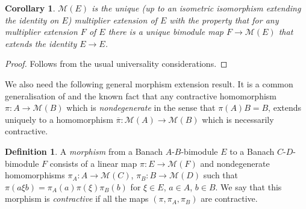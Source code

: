 \documentclass[11 pt, leqno]{amsart}
\numberwithin{equation}{section}
\theoremstyle{plain}
\newtheorem{cor}[thm]{Corollary}
\theoremstyle{definition}
\newtheorem {defn}[thm] {Definition}
\newcommand{\M}{\mathcal M}
\begin{document}
\begin{cor}\label{cor:universal_multipliers}
$\M(E)$ is the unique (up to an isometric isomorphism extending the identity on $E$) multiplier extension of $E$ with the property that for any multiplier extension $F$ of $E$ there is a unique bimodule map $F\to \M(E)$ that extends the identity $E\to E$. 
\end{cor}
\begin{proof} 
Follows from the usual universality considerations.
\end{proof}

We also need the following general morphism extension result. 
It is a common generalisation of \cite[Theorem 2.8]{Daws} and the known fact that any contractive homomorphism $\pi:A\to \M(B)$ which is \emph{nondegenerate} in the sense that $\pi(A)B=B$, extends uniquely to a homomorphism $\overline{\pi}:\M(A)\to \M(B)$ which is  necessarily contractive.

\begin{defn}\label{def:bimodule_morphism}
A \emph{morphism} from  a Banach $A$-$B$-bimodule $E$ to a Banach $C$-$D$-bimodule $F$ consists of a linear map $\pi:E\to \M(F)$ and nondegenerate homomorphisms $\pi_A:A\to \M(C)$, $\pi_B:B\to \M(D)$ such that $\pi(a\xi b)=\pi_A(a)\pi(\xi)\pi_B(b)$ for $\xi \in E$, $a\in A$, $b\in B$.
We say that this morphism is \emph{contractive} if all the maps $(\pi,\pi_A,\pi_B)$ are contractive.
\end{defn}
\end{document}
